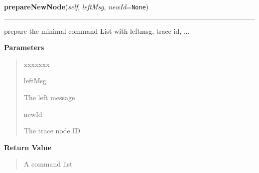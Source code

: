 \hspace{.8\funcindent}\begin{boxedminipage}{\funcwidth}

    \raggedright \textbf{prepareNewNode}(\textit{self}, \textit{leftMsg}, \textit{newId}={\tt None})

    \vspace{-1.5ex}

    \rule{\textwidth}{0.5\fboxrule}
\setlength{\parskip}{2ex}
    prepare the minimal command List with leftmsg, trace id, ...

\setlength{\parskip}{1ex}
      \textbf{Parameters}
      \vspace{-1ex}

      \begin{quote}
        \begin{Ventry}{xxxxxxx}

          \item[leftMsg]

          The left message

          \item[newId]

          The trace node ID

        \end{Ventry}

      \end{quote}

      \textbf{Return Value}
    \vspace{-1ex}

      \begin{quote}
      A command list

      \end{quote}

    \end{boxedminipage}

    \label{tracetool:TraceToSend:send}

    \vspace{0.5ex}

